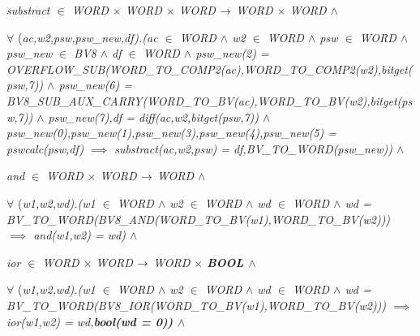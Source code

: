 \begin{sloppypar}
\hspace*{0.10in}\it substract $\in$  \it WORD $\times$ \it WORD $\times$ \it WORD  $\rightarrow$  \it WORD $\times$ \it WORD  $\land$ 

\hspace*{0.10in} $\forall$ \rm (\it ac\rm ,\it w2\rm ,\it psw\rm ,\it psw\_new\rm ,\it df\rm )\rm .\rm (\it ac $\in$  \it WORD  $\land$  \it w2 $\in$  \it WORD  $\land$  \it psw $\in$  \it WORD  $\land$  \it psw\_new $\in$  \it BV8  $\land$  \it df $\in$  \it WORD  $\land$  \it psw\_new\rm (\rm 2\rm ) \rm = \it OVERFLOW\_SUB\rm (\it WORD\_TO\_COMP2\rm (\it ac\rm )\rm ,\it WORD\_TO\_COMP2\rm (\it w2\rm )\rm ,\it bitget\rm (\it psw\rm ,\rm 7\rm )\rm )  $\land$  \it psw\_new\rm (\rm 6\rm ) \rm = \it BV8\_SUB\_AUX\_CARRY\rm (\it WORD\_TO\_BV\rm (\it ac\rm )\rm ,\it WORD\_TO\_BV\rm (\it w2\rm )\rm ,\it bitget\rm (\it psw\rm ,\rm 7\rm )\rm )  $\land$  \it psw\_new\rm (\rm 7\rm )\rm ,\it df \rm = \it diff\rm (\it ac\rm ,\it w2\rm ,\it bitget\rm (\it psw\rm ,\rm 7\rm )\rm )  $\land$  \it psw\_new\rm (\rm 0\rm )\rm ,\it psw\_new\rm (\rm 1\rm )\rm ,\it psw\_new\rm (\rm 3\rm )\rm ,\it psw\_new\rm (\rm 4\rm )\rm ,\it psw\_new\rm (\rm 5\rm ) \rm = \it pswcalc\rm (\it psw\rm ,\it df\rm )  $\implies$  \it substract\rm (\it ac\rm ,\it w2\rm ,\it psw\rm ) \rm = \it df\rm ,\it BV\_TO\_WORD\rm (\it psw\_new\rm )\rm )  $\land$ 

\hspace*{0.10in}\it and $\in$  \it WORD $\times$ \it WORD  $\rightarrow$  \it WORD  $\land$ 

\hspace*{0.10in} $\forall$ \rm (\it w1\rm ,\it w2\rm ,\it wd\rm )\rm .\rm (\it w1 $\in$  \it WORD  $\land$  \it w2 $\in$  \it WORD  $\land$  \it wd $\in$  \it WORD  $\land$  \it wd \rm = \it BV\_TO\_WORD\rm (\it BV8\_AND\rm (\it WORD\_TO\_BV\rm (\it w1\rm )\rm ,\it WORD\_TO\_BV\rm (\it w2\rm )\rm )\rm )  $\implies$  \it and\rm (\it w1\rm ,\it w2\rm ) \rm = \it wd\rm )  $\land$ 

\hspace*{0.10in}\it ior $\in$  \it WORD $\times$ \it WORD  $\rightarrow$  \it WORD $\times$ \bf BOOL  $\land$ 

\hspace*{0.10in} $\forall$ \rm (\it w1\rm ,\it w2\rm ,\it wd\rm )\rm .\rm (\it w1 $\in$  \it WORD  $\land$  \it w2 $\in$  \it WORD  $\land$  \it wd $\in$  \it WORD  $\land$  \it wd \rm = \it BV\_TO\_WORD\rm (\it BV8\_IOR\rm (\it WORD\_TO\_BV\rm (\it w1\rm )\rm ,\it WORD\_TO\_BV\rm (\it w2\rm )\rm )\rm )  $\implies$  \it ior\rm (\it w1\rm ,\it w2\rm ) \rm = \it wd\rm ,\bf bool\rm (\it wd \rm = \rm 0\rm )\rm )  $\land$ 


\end{sloppypar}
